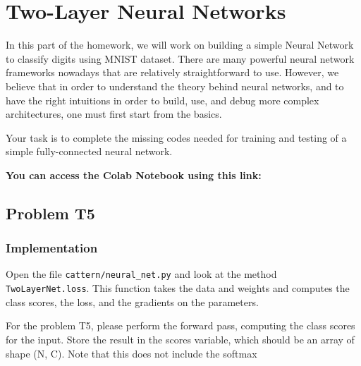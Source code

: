 \documentclass[12pt, a4paper]{article}
\begin{document}
    \pagebreak

    \section{Two-Layer Neural Networks}
        In this part of the homework, we will work on building a simple Neural Network to classify digits using MNIST dataset.
        There are many powerful neural network frameworks nowadays that are relatively straightforward to use.
        However, we believe that in order to understand the theory behind neural networks, and to have the right intuitions in order to build, use, and debug more complex architectures, one must first start from the basics.

        Your task is to complete the missing codes needed for training and testing of a simple fully-connected neural network.

        \textbf{You can access the Colab Notebook using this link: \\ }

        \subsection{Problem T5}
            \subsubsection{Implementation}
                Open the file \texttt{cattern/neural\_net.py} and look at the method \texttt{TwoLayerNet.loss}.
                This function takes the data and weights and computes the class scores, the loss, and the gradients on the parameters.

                For the problem T5, please perform the forward pass, computing the class scores for the input.
                Store the result in the scores variable, which should be an array of shape (N, C). Note that this does not include the softmax
\end{document}
